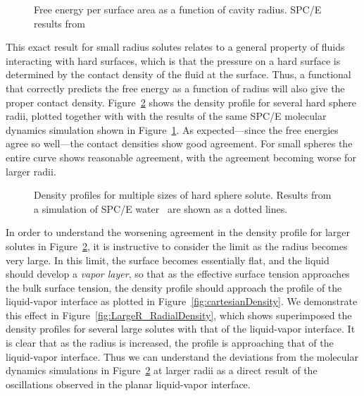 \documentclass[letterpaper,twocolumn,amsmath,amssymb,prb]{revtex4-1}
\begin{document}
\begin{figure}
\begin{center}
\end{center}
\caption{Free energy per surface area as a function of cavity
  radius. SPC/E results from~\cite{huang2001shs}}
\label{fig:surfaceTension}
\end{figure}

This exact result for small radius solutes relates to a general property of
fluids interacting with hard surfaces, which is that the pressure on a hard
surface is determined by the contact density of the fluid at the surface.
Thus, a functional that correctly predicts the free energy as a function of
radius will also give the proper contact density.
Figure~\ref{fig:cavities} shows the density profile for several hard sphere
radii, plotted together with with the results of the same SPC/E molecular
dynamics simulation shown in
Figure~\ref{fig:surfaceTension}\cite{huang2001shs}.  As expected---since
the free energies agree so well---the contact densities show good
agreement.  For small spheres the entire curve shows reasonable agreement,
with the agreement becoming worse for larger radii.

\begin{figure}[b]
\begin{center}
\end{center}
\caption{Density profiles for multiple sizes of hard sphere solute.
  Results from a simulation of SPC/E water~\cite{huang2001shs} are
  shown as a dotted lines.}
\label{fig:cavities}
\end{figure}

In order to understand the worsening agreement in the density profile
for larger solutes in Figure~\ref{fig:cavities}, it is instructive to
consider the limit as the radius becomes very large.  In this limit,
the surface becomes essentially flat, and the liquid should develop a
\emph{vapor layer}, so that as the effective surface tension
approaches the bulk surface tension, the density profile should
approach the profile of the liquid-vapor interface as plotted in
Figure~\ref{fig:cartesianDensity}.  We demonstrate this effect in
Figure~\ref{fig:LargeR_RadialDensity}, which shows superimposed the
density profiles for several large solutes with that of the
liquid-vapor interface.  It is clear that as the radius is increased,
the profile is approaching that of the liquid-vapor interface.  Thus
we can understand the deviations from the molecular dynamics
simulations in Figure~\ref{fig:cavities} at larger radii as a direct
result of the oscillations observed in the planar liquid-vapor
interface.
\end{document}
